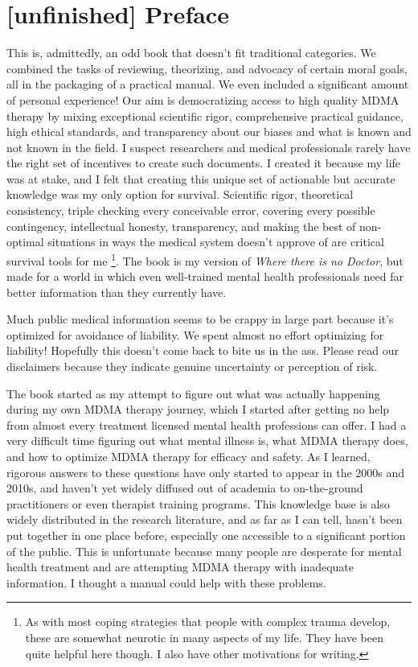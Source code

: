 \documentclass[12pt,letterpaper]{book}
\begin{document}
\chapter*{[unfinished] Preface}
This is, admittedly, an odd book that doesn't fit traditional categories. We combined the tasks of reviewing, theorizing, and advocacy of certain moral goals, all in the packaging of a practical manual. We even included a significant amount of personal experience! Our aim is democratizing access to high quality MDMA therapy by mixing exceptional scientific rigor, comprehensive practical guidance, high ethical standards, and transparency about our biases and what is known and not known in the field. I suspect researchers and medical professionals rarely have the right set of incentives to create such documents. I created it because my life was at stake, and I felt that creating this unique set of actionable but accurate knowledge was my only option for survival. Scientific rigor, theoretical consistency, triple checking every conceivable error, covering every possible contingency, intellectual honesty, transparency, and making the best of non-optimal situations in ways the medical system doesn't approve of are critical survival tools for me \footnote{As with most coping strategies that people with complex trauma develop, these are somewhat neurotic in many aspects of my life. They have been quite helpful here though. I also have other motivations for writing.}. The book is my version of \textit{Where there is no Doctor}, but made for a world in which even well-trained mental health professionals need far better information than they currently have.

Much public medical information seems to be crappy in large part because it’s optimized for avoidance of liability. We spent almost no effort optimizing for liability! Hopefully this doesn’t come back to bite us in the ass. Please read our disclaimers because they indicate genuine uncertainty or perception of risk.

The book started as my attempt to figure out what was actually happening during my own MDMA therapy journey, which I started after getting no help from almost every treatment licensed mental health professions can offer. I had a very difficult time figuring out what mental illness is, what MDMA therapy does, and how to optimize MDMA therapy for efficacy and safety. As I learned, rigorous answers to these questions have only started to appear in the 2000s and 2010s, and haven't yet widely diffused out of academia to on-the-ground practitioners or even therapist training programs. This knowledge base is also widely distributed in the research literature, and as far as I can tell, hasn't been put together in one place before, especially one accessible to a significant portion of the public. This is unfortunate because many people are desperate for mental health treatment and are attempting MDMA therapy with inadequate information. I thought a manual could help with these problems.
\end{document}
